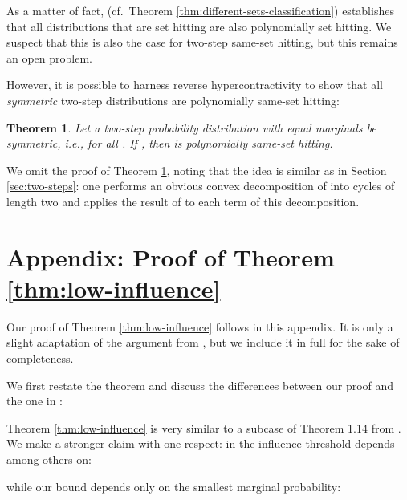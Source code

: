 \documentclass{daj}
\newcommand{\1}{\mathbbm{1}}
\theoremstyle{plain}
\newtheorem{theorem}{Theorem}[section]
\theoremstyle{definition}
\begin{document}
As a matter of fact, \cite{MOS13} 
(cf.~Theorem \ref{thm:different-sets-classification}) establishes that
all distributions that are set hitting are also polynomially set hitting.
We suspect that this is also the case for two-step same-set hitting,
but this remains an open problem.

However, it is possible to harness reverse hypercontractivity to show
that all \emph{symmetric} two-step distributions are polynomially same-set
hitting:
\begin{theorem}
\label{thm:symmetric}
Let a two-step probability distribution with equal marginals 
 be symmetric, i.e.,
 for all .
If , then  is polynomially same-set
hitting.
\end{theorem}

We omit the proof of Theorem \ref{thm:symmetric}, 
noting that the idea is similar as in Section \ref{sec:two-steps}:
one performs an obvious convex decomposition of  into cycles
of length two and applies
the result of \cite{MOS13} to each term of this decomposition.

\appendix \section{Appendix: Proof of Theorem \ref{thm:low-influence}}
\label{sec:low-influence-proof}

Our proof of Theorem \ref{thm:low-influence} follows in this appendix. 
It is only a slight adaptation of the argument from \cite{Mos10}, but
we include it in full for the sake of completeness.

We first restate the theorem and discuss the differences between
our proof and the one in \cite{Mos10}:
\lowinfluence*

Theorem \ref{thm:low-influence} is very similar to a subcase of Theorem 1.14
from \cite{Mos10}.  We make a stronger claim with one respect: in
\cite{Mos10} the influence threshold  depends among others on:

while our bound depends only on the smallest marginal probability:
\end{document}
